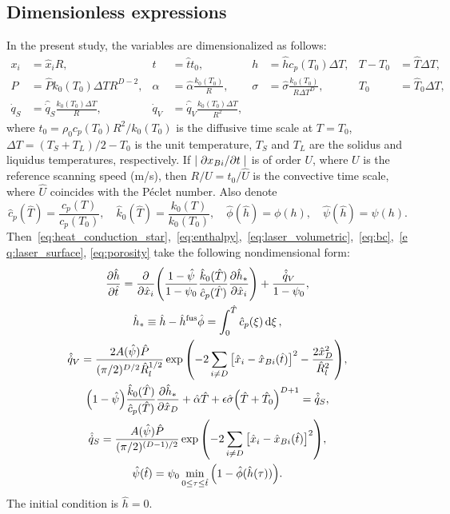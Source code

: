\documentclass{article}
\newcommand{\fusion}[1]{{#1}^\mathrm{fus}}
\newcommand{\Hx}{\hat{x}}
\newcommand{\Ht}{\hat{t}}
\newcommand{\Hh}{\hat{h}}
\newcommand{\HT}{\hat{T}}
\newcommand{\HP}{\hat{P}}
\newcommand{\Halpha}{\hat{\alpha}}
\newcommand{\Hsigma}{\hat{\sigma}}
\newcommand{\Hc}{\hat{c}}
\newcommand{\Hk}{\hat{k}}
\newcommand{\Hphi}{\hat{\phi}}
\newcommand{\Hpsi}{\hat{\psi}}
\newcommand{\HR}{\hat{R}}
\newcommand{\HU}{\hat{U}}
\newcommand{\Hq}{\hat{\dot{q}}}
\begin{document}
\subsection{Dimensionless expressions}

In the present study, the variables are dimensionalized as follows:
\begin{equation}\label{eq:dimensionless}
    \begin{aligned}
        x_i &= \Hx_iR, & t &= \Ht t_0, & h &= \Hh c_p(T_0)\Delta{T}, & T - T_0 &= \HT\Delta{T}, \\
        P &= \HP k_0(T_0)\Delta{T}R^{D-2}, & \alpha &= \Halpha\frac{k_0(T_0)}R, &
            \sigma &= \Hsigma\frac{k_0(T_0)}{R\Delta{T}^D}, & T_0 &= \HT_0\Delta{T}, \\
        \dot{q}_S &= \Hq_S\frac{k_0(T_0)\Delta{T}}{R}, & \dot{q}_V &= \Hq_V\frac{k_0(T_0)\Delta{T}}{R^2},
    \end{aligned}
\end{equation}
where \(t_0 = \rho_0 c_p(T_0) R^2/k_0(T_0)\) is the diffusive time scale at \(T=T_0\),
\(\Delta{T} = (T_S+T_L)/2 - T_0\) is the unit temperature,
\(T_S\) and \(T_L\) are the solidus and liquidus temperatures, respectively.
If \(|\pdv*{x_{Bi}}{t}|\) is of order \(U\), where \(U\) is the reference scanning speed (\si{m/s}),
then \(R/U=t_0/\HU\) is the convective time scale, where \(\HU\) coincides with the P\'eclet number. Also denote
\begin{equation}\label{eq:dimensionless2}
    \Hc_p(\HT) = \frac{c_p(T)}{c_p(T_0)}, \quad
    \Hk_0(\HT) = \frac{k_0(T)}{k_0(T_0)}, \quad
    \Hphi(\Hh) = \phi(h), \quad
    \Hpsi(\Hh) = \psi(h).
\end{equation}
Then~\eqref{eq:heat_conduction_star},~\eqref{eq:enthalpy},~\eqref{eq:laser_volumetric},~\eqref{eq:bc},~\eqref{eq:laser_surface},
\eqref{eq:porosity} take the following nondimensional form:
\begin{gather}
    \pdv{\Hh}{\Ht} = \pdv{\Hx_i}\qty(
        \frac{1-\Hpsi}{1-\psi_0}
        \frac{\Hk_0(\HT)}{\Hc_p(\HT)}\pdv{\Hh_*}{\Hx_i}
    ) + \frac{\Hq_V}{1-\psi_0}, \label{eq:heat_conduction_hats} \\
    \Hh_* \equiv \Hh - \fusion{\Hh}\Hphi = \int_0^{\HT} \Hc_p(\xi)\dd{\xi}, \label{eq:enthalpy_hats} \\
    \Hq_V = \frac{2A(\Hpsi)\HP}{(\pi/2)^{D/2}\HR_l^{1/2}}
        \exp\qty( -2\sum_{i\neq D}\qty[\Hx_i-\Hx_{Bi}(\Ht)]^2 - \frac{2\Hx_D^2}{\HR_l^2} ), \label{eq:laser_volumetric_hats} \\
    \qty(1-\Hpsi) \frac{\Hk_0(\HT)}{\Hc_p(\HT)}\pdv{\Hh_*}{\Hx_D} +
        \Halpha\HT + \epsilon\Hsigma \qty(\HT + \HT_0)^{D+1} = \Hq_S, \label{eq:bc_hats} \\
    \Hq_S = \frac{A(\Hpsi)\HP}{(\pi/2)^{(D-1)/2}}
        \exp\qty( -2\sum_{i\neq D}\qty[\Hx_i-\Hx_{Bi}(\Ht)]^2 ), \label{eq:laser_surface_hats} \\
    \Hpsi(\Ht) = \psi_0\min_{0\leq\tau\leq \Ht}\qty( 1-\Hphi(\Hh(\tau)) ). \label{eq:porosity_hats}
\end{gather}
The initial condition is \(\Hh = 0\).
\end{document}
